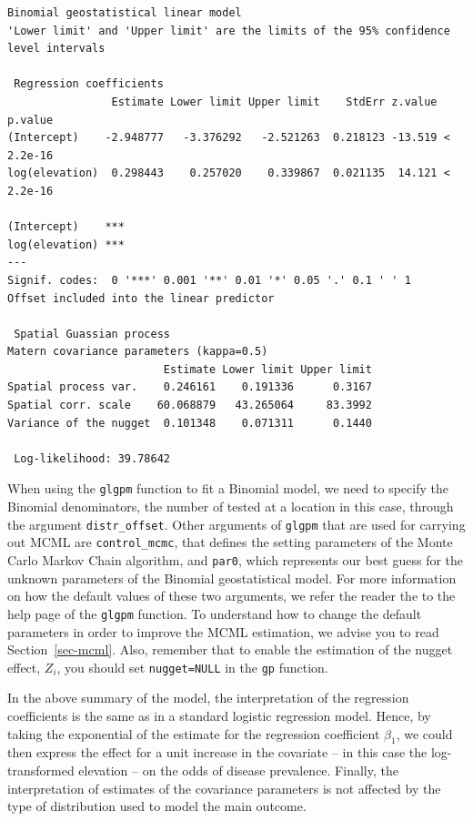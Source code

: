 \documentclass[
  letterpaper,
]{krantz}
\begin{document}
\begin{verbatim}
Binomial geostatistical linear model 
'Lower limit' and 'Upper limit' are the limits of the 95% confidence level intervals 

 Regression coefficients 
                Estimate Lower limit Upper limit    StdErr z.value   p.value
(Intercept)    -2.948777   -3.376292   -2.521263  0.218123 -13.519 < 2.2e-16
log(elevation)  0.298443    0.257020    0.339867  0.021135  14.121 < 2.2e-16
                  
(Intercept)    ***
log(elevation) ***
---
Signif. codes:  0 '***' 0.001 '**' 0.01 '*' 0.05 '.' 0.1 ' ' 1
Offset included into the linear predictor 

 Spatial Guassian process 
Matern covariance parameters (kappa=0.5) 
                        Estimate Lower limit Upper limit
Spatial process var.    0.246161    0.191336      0.3167
Spatial corr. scale    60.068879   43.265064     83.3992
Variance of the nugget  0.101348    0.071311      0.1440

 Log-likelihood: 39.78642
\end{verbatim}

When using the \texttt{glgpm} function to fit a Binomial model, we need
to specify the Binomial denominators, the number of tested at a location
in this case, through the argument \texttt{distr\_offset}. Other
arguments of \texttt{glgpm} that are used for carrying out MCML are
\texttt{control\_mcmc}, that defines the setting parameters of the Monte
Carlo Markov Chain algorithm, and \texttt{par0}, which represents our
best guess for the unknown parameters of the Binomial geostatistical
model. For more information on how the default values of these two
arguments, we refer the reader the to the help page of the
\texttt{glgpm} function. To understand how to change the default
parameters in order to improve the MCML estimation, we advise you to
read Section~\ref{sec-mcml}. Also, remember that to enable the
estimation of the nugget effect, \(Z_i\), you should set
\texttt{nugget=NULL} in the \texttt{gp} function.

In the above summary of the model, the interpretation of the regression
coefficients is the same as in a standard logistic regression model.
Hence, by taking the exponential of the estimate for the regression
coefficient \(\beta_1\), we could then express the effect for a unit
increase in the covariate -- in this case the log-transformed elevation
-- on the odds of disease prevalence. Finally, the interpretation of
estimates of the covariance parameters is not affected by the type of
distribution used to model the main outcome.
\end{document}
